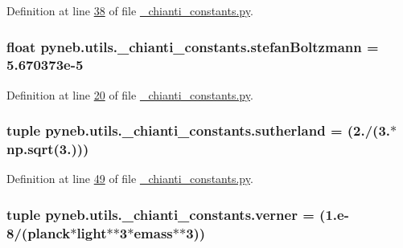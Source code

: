 Definition at line \hyperlink{__chianti__constants_8py_source_l00038}{38} of file \hyperlink{__chianti__constants_8py_source}{\+\_\+chianti\+\_\+constants.\+py}.

\hypertarget{namespacepyneb_1_1utils_1_1__chianti__constants_ab50a2106d6a3159beb3b0e0edcefec89}{}
\subsubsection[{stefan\+Boltzmann}]{\setlength{\rightskip}{0pt plus 5cm}float pyneb.\+utils.\+\_\+chianti\+\_\+constants.\+stefan\+Boltzmann = 5.\+670373e-\/5}\label{namespacepyneb_1_1utils_1_1__chianti__constants_ab50a2106d6a3159beb3b0e0edcefec89}


Definition at line \hyperlink{__chianti__constants_8py_source_l00020}{20} of file \hyperlink{__chianti__constants_8py_source}{\+\_\+chianti\+\_\+constants.\+py}.

\hypertarget{namespacepyneb_1_1utils_1_1__chianti__constants_ae948d4e5d259213534b8373b3819e39a}{}
\subsubsection[{sutherland}]{\setlength{\rightskip}{0pt plus 5cm}tuple pyneb.\+utils.\+\_\+chianti\+\_\+constants.\+sutherland = (2./(3.$\ast$np.\+sqrt(3.)))}\label{namespacepyneb_1_1utils_1_1__chianti__constants_ae948d4e5d259213534b8373b3819e39a}


Definition at line \hyperlink{__chianti__constants_8py_source_l00049}{49} of file \hyperlink{__chianti__constants_8py_source}{\+\_\+chianti\+\_\+constants.\+py}.

\hypertarget{namespacepyneb_1_1utils_1_1__chianti__constants_a8b5b3de48de538cfc793e5a020de12e3}{}
\subsubsection[{verner}]{\setlength{\rightskip}{0pt plus 5cm}tuple pyneb.\+utils.\+\_\+chianti\+\_\+constants.\+verner = (1.e-\/8/({\bf planck}$\ast${\bf light}$\ast$$\ast$3$\ast${\bf emass}$\ast$$\ast$3))}\label{namespacepyneb_1_1utils_1_1__chianti__constants_a8b5b3de48de538cfc793e5a020de12e3}


